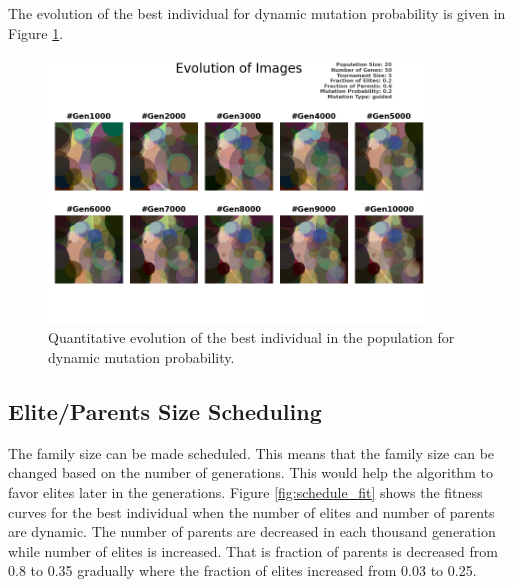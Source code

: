\documentclass{assignment}
\begin{document}
The evolution of the best individual for dynamic mutation probability is given in Figure \ref{fig:dynamic_mutation_image}.

\begin{figure}[!htb]
    \centering
    \includegraphics[width=0.9\textwidth]{figures/images_outputPROB_20_50_5_0.2_0.6_0.2_guided.png}
    \caption{Quantitative evolution of the best individual in the population for dynamic mutation probability.}
    \label{fig:dynamic_mutation_image}
\end{figure}


\subsection{Elite/Parents Size Scheduling}

The family size can be made scheduled. This means that the family size can be changed based on the number of generations. This would help the algorithm to favor elites later in the generations. Figure \ref{fig:schedule_fit} shows the fitness curves for the best individual when the number of elites and number of parents are dynamic. The number of parents are decreased in each thousand generation while number of elites is increased. That is fraction of parents is decreased from 0.8 to 0.35 gradually where the fraction of elites increased from 0.03 to 0.25.
\end{document}
